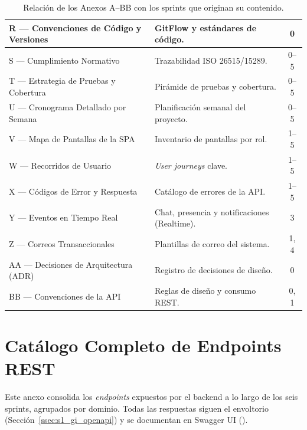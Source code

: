 \begin{table}[!ht]
\begin{tabularx}{\textwidth}{|l|X|c|}
\rowcolor{grisTecnico}
R — Convenciones de Código y Versiones & GitFlow y estándares de código. & 0 \\ \hline
S — Cumplimiento Normativo & Trazabilidad ISO 26515/15289. & 0--5 \\ \hline
\rowcolor{grisTecnico}
T — Estrategia de Pruebas y Cobertura & Pirámide de pruebas y cobertura. & 0--5 \\ \hline
U — Cronograma Detallado por Semana & Planificación semanal del proyecto. & 0--5 \\ \hline
\rowcolor{grisTecnico}
V — Mapa de Pantallas de la SPA & Inventario de pantallas por rol. & 1--5 \\ \hline
W — Recorridos de Usuario & \textit{User journeys} clave. & 1--5 \\ \hline
\rowcolor{grisTecnico}
X — Códigos de Error y Respuesta & Catálogo de errores de la API. & 1--5 \\ \hline
Y — Eventos en Tiempo Real & Chat, presencia y notificaciones (Realtime). & 3 \\ \hline
\rowcolor{grisTecnico}
Z — Correos Transaccionales & Plantillas de correo del sistema. & 1, 4 \\ \hline
AA — Decisiones de Arquitectura (ADR) & Registro de decisiones de diseño. & 0 \\ \hline
\rowcolor{grisTecnico}
BB — Convenciones de la API & Reglas de diseño y consumo REST. & 0, 1 \\ \hline
\end{tabularx}\normalfont\normalsize
\caption{Relación de los Anexos A--BB con los sprints que originan su contenido.}
\label{tab:anexo_sprints}
\end{table}

\clearpage

\chapter{Catálogo Completo de Endpoints REST}
\label{cap:anexo_endpoints}

Este anexo consolida los \textit{endpoints} expuestos por el backend  a lo
largo de los seis sprints, agrupados por dominio. Todas las respuestas siguen el envoltorio
 (Sección~\ref{ssec:s1_gi_openapi}) y se documentan en Swagger UI
().\par

